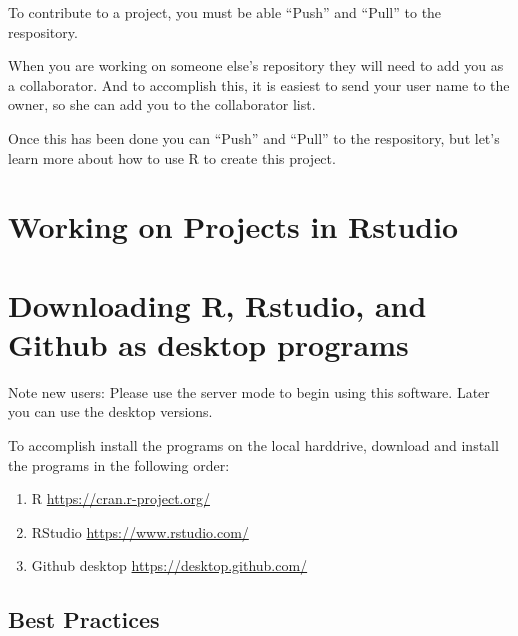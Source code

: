 \documentclass[12pt]{../SOP4_alpha}\usepackage[]{graphicx}\usepackage[]{color}
\begin{document}
\NP To contribute to a project, you must be able ``Push'' and ``Pull'' to the respository. 

\NP When you are working on someone else's repository they will need to add you as a collaborator. And to accomplish this, it is easiest to send your user name to the owner, so she can add you to the collaborator list.  

\NP Once this has been done you can ``Push'' and ``Pull'' to the respository, but let's learn more about how to use R to create this project. 




\section{Working on Projects in Rstudio}


\section{Downloading R, Rstudio, and Github as desktop programs}

\NP Note new users: Please use the server mode to begin using this software. Later you can use the desktop versions. 

\NP To accomplish install the programs on the local harddrive, download and install the programs in the following order: 

\begin{enumerate}
  \item R \url{https://cran.r-project.org/}
  \item RStudio \url{https://www.rstudio.com/}
  \item Github desktop \url{https://desktop.github.com/}
\end{enumerate}


\subsection{Best Practices}
\end{document}
